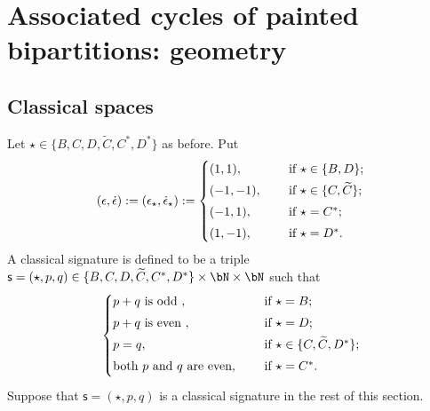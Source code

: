 \documentclass[12pt,a4paper]{amsart}
\numberwithin{equation}{section}
\theoremstyle{remark}
\begin{document}
\section{Associated cycles of painted bipartitions: geometry} \label{sec:Nil}



\subsection{Classical spaces}
Let $\star\in \{B,C,D, \widetilde C, C^*, D^*\}$ as before. Put
\[
(\epsilon, \dot \epsilon):=(\epsilon_\star, \dot \epsilon_\star):=\begin{cases}
  (1,1),&\quad \textrm{ if  $\star\in \{B,D\}$;} \smallskip \\
 (-1,-1),&\quad \textrm{ if  $\star\in \{C,\widetilde C\}$;} \smallskip \\
 (-1,1),&\quad \textrm{ if  $\star=C^*$;} \smallskip \\
 (1,-1),&\quad \textrm{ if  $\star=D^*$.}
 \end{cases}
\]
A classical signature is defined to be a triple  $\mathsf s=(\star, p,q)\in  \{B,C,D, \widetilde C, C^*, D^*\}\times \bN\times \bN$ such that
\[
\begin{cases}
  p+q\textrm{ is odd },&\quad \textrm{ if  $\star=B$;} \smallskip \\
   p+q\textrm{ is even },&\quad \textrm{ if  $\star=D$;} \smallskip \\
 p=q,&\quad \textrm{ if  $\star\in \{C,\widetilde C, D^*\}$;} \smallskip \\
\textrm{both $p$ and $q$ are even} ,&\quad \textrm{ if  $\star=C^*$.} \smallskip \\
 \end{cases}
\]
 Suppose that $\mathsf s=(\star, p,q)$ is a classical  signature in the rest of this section.
\end{document}
